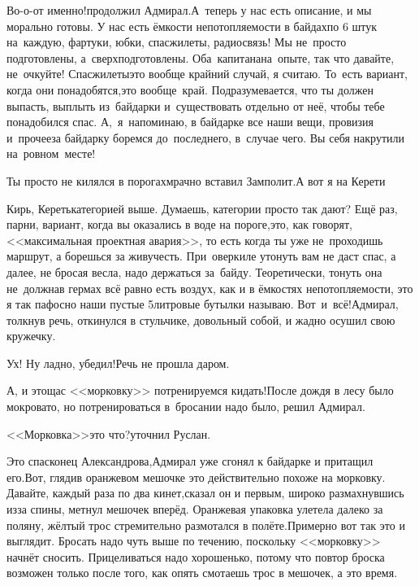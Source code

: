\diagdash Во-о-от именно!\mdash продолжил Адмирал.\mdash А~теперь у нас есть описание, и мы морально готовы. У нас есть ёмкости непотопляемости в байдах\mdash по 6 штук на~каждую, фартуки, юбки, спасжилеты, радиосвязь! Мы не~просто подготовлены, а~сверхподготовлены. Оба~капитана\mdash на~опыте, так что давайте, не~очкуйте! Спасжилеты\mdash это вообще крайний случай, я считаю. То~есть вариант, когда они понадобятся,\mdash это вообще~край. Подразумевается, что ты должен выпасть, выплыть из~байдарки и~существовать отдельно от неё, чтобы тебе понадобился спас. А,~я~напоминаю, в байдарке все наши вещи, провизия и~прочее\mdash за байдарку боремся до~последнего, в~случае чего. Вы себя накрутили на~ровном~месте!

\diagdash Ты просто не килялся в порогах\myldots{}\mdash мрачно вставил Замполит.\mdash А вот я на Керети\myldots{}

\diagdash Кирь, Кереть\mdash категорией выше. Думаешь, категории просто так дают? Ещё раз, парни, вариант, когда вы оказались в воде на пороге,\mdash это, как говорят, <<максимальная проектная авария>>, то есть когда ты уже не~проходишь маршрут, а борешься за живучесть. При~оверкиле утонуть вам не даст спас, а далее, не бросая весла, надо держаться за~байду. Теоретически, тонуть она не~должна\mdash в гермах всё равно есть воздух, как и в ёмкостях непотопляемости, это я так пафосно наши пустые 5\sdash литровые бутылки называю. Вот~и~всё!\mdash Адмирал, толкнув речь, откинулся в стульчике, довольный собой, и жадно осушил свою кружечку.

\diagdash Ух! Ну ладно, убедил!\mdash Речь не прошла даром.

\diagdash А, и это\mdash щас <<морковку>> потренируемся кидать!\mdash После дождя в лесу было мокровато, но потренироваться в~бросании надо было, решил Адмирал.

\diagdash <<Морковка>>\mdash это что?\mdash уточнил Руслан.

\diagdash Это спасконец Александрова,\mdash Адмирал уже сгонял к байдарке и притащил его.\mdash Вот, гляди\mdash в оранжевом мешочке это действительно похоже на морковку. Давайте, каждый раза по два кинет,\mdash сказал он и первым, широко размахнувшись из\sdash за спины, метнул мешочек вперёд. Оранжевая упаковка улетела далеко за поляну, жёлтый трос стремительно размотался в полёте.\mdash Примерно вот так это и выглядит. Бросать надо чуть выше по течению, поскольку <<морковку>> начнёт сносить. Прицеливаться надо хорошенько, потому что повтор броска возможен только после того, как опять смотаешь трос в мешочек, а это время.

